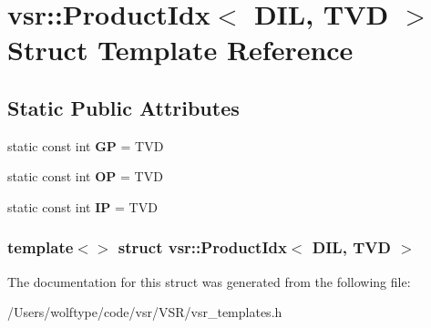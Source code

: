 \hypertarget{structvsr_1_1_product_idx_3_01_d_i_l_00_01_t_v_d_01_4}{\section{vsr\-:\-:Product\-Idx$<$ D\-I\-L, T\-V\-D $>$ Struct Template Reference}
\label{structvsr_1_1_product_idx_3_01_d_i_l_00_01_t_v_d_01_4}
}
\subsection*{Static Public Attributes}
\begin{DoxyCompactItemize}
\item 
\hypertarget{structvsr_1_1_product_idx_3_01_d_i_l_00_01_t_v_d_01_4_a76347d2a1c70f92e6a313db28614c10b}{static const int {\bfseries G\-P} = T\-V\-D}\label{structvsr_1_1_product_idx_3_01_d_i_l_00_01_t_v_d_01_4_a76347d2a1c70f92e6a313db28614c10b}

\item 
\hypertarget{structvsr_1_1_product_idx_3_01_d_i_l_00_01_t_v_d_01_4_a4854d134ea13cb0d74f6ce79f4594a1d}{static const int {\bfseries O\-P} = T\-V\-D}\label{structvsr_1_1_product_idx_3_01_d_i_l_00_01_t_v_d_01_4_a4854d134ea13cb0d74f6ce79f4594a1d}

\item 
\hypertarget{structvsr_1_1_product_idx_3_01_d_i_l_00_01_t_v_d_01_4_a234c60c464e6b64c95f1b4bba097fbeb}{static const int {\bfseries I\-P} = T\-V\-D}\label{structvsr_1_1_product_idx_3_01_d_i_l_00_01_t_v_d_01_4_a234c60c464e6b64c95f1b4bba097fbeb}

\end{DoxyCompactItemize}
\subsubsection*{template$<$$>$ struct vsr\-::\-Product\-Idx$<$ D\-I\-L, T\-V\-D $>$}



The documentation for this struct was generated from the following file\-:\begin{DoxyCompactItemize}
\item 
/\-Users/wolftype/code/vsr/\-V\-S\-R/vsr\-\_\-templates.\-h\end{DoxyCompactItemize}
